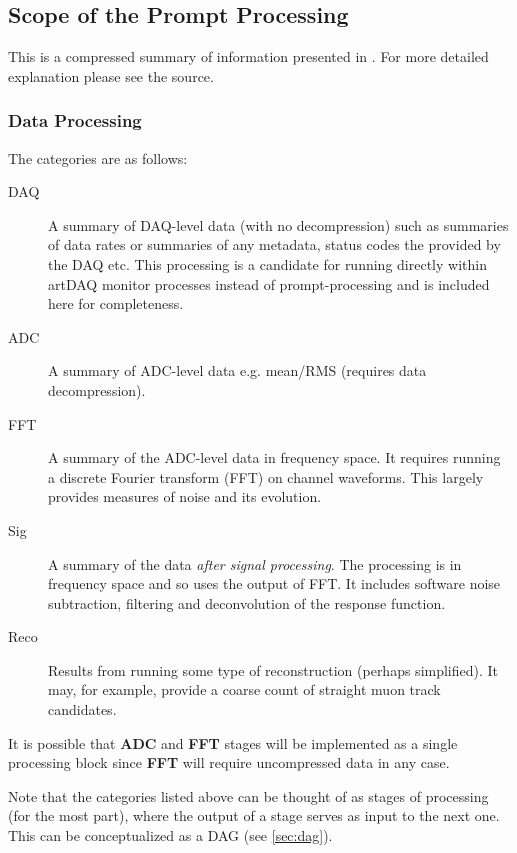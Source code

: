\documentclass[pdftex,12pt,letter]{article}
\begin{document}
\subsection{Scope of the Prompt Processing}
This is a compressed summary of information presented in \cite{docdb1811}.
For more detailed explanation please see the source.

\subsubsection{Data Processing}
\label{sec:categories}
The categories are as follows:

\begin{description}

\item[DAQ] A summary of DAQ-level data (with no decompression) such as summaries of data
 rates  or summaries of any metadata, status codes the provided by the DAQ etc.
This processing is a candidate for running directly within artDAQ
monitor processes instead of prompt-processing and is included here
for completeness.

\item[ADC] A summary of ADC-level data e.g. mean/RMS (requires data decompression).


\item[FFT] A summary of the ADC-level data in frequency space. It requires running a discrete Fourier
transform (FFT) on channel waveforms. This largely  provides measures of noise and its
evolution.

\item[Sig] A summary of the data \textit{after signal processing}.
The processing is in  frequency space and so uses the output of FFT.  It includes software
noise subtraction, filtering and deconvolution of the response function.

\item[Reco] Results from running some type of reconstruction (perhaps simplified).
It may, for  example, provide a coarse count of straight muon track candidates.

\end{description}


\noindent It is possible that \textbf{ADC} and \textbf{FFT} stages will be implemented as a single processing
block since \textbf{FFT} will require uncompressed data in any case.

Note that the categories listed above can be thought of as stages of processing (for the most part), where
the output of a stage serves as input to the next one. This can be conceptualized as a DAG (see \ref{sec:dag}).
\end{document}
